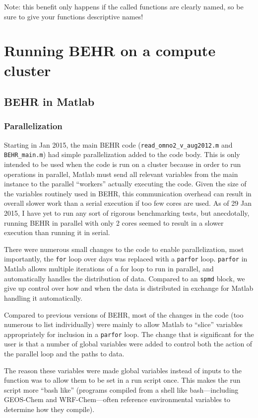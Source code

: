 \documentclass[12pt]{article}
\begin{document}
	Note: this benefit only happens if the called functions are clearly named, so be sure to give your functions descriptive names!



\section{Running BEHR on a compute cluster} \label{sec:Cluster}
	\subsection{BEHR in Matlab}
	\subsubsection{Parallelization}
		Starting in Jan 2015, the main BEHR code (\texttt{read\_omno2\_v\_aug2012.m} and \texttt{BEHR\_main.m}) had simple parallelization added to the code body.  This is only intended to be used when the code is run on a cluster because in order to run operations in parallel, Matlab must send all relevant variables from the main instance to the parallel ``workers'' actually executing the code.  Given the size of the variables routinely used in BEHR, this communication overhead can result in overall slower work than a serial execution if too few cores are used.  As of 29 Jan 2015, I have yet to run any sort of rigorous benchmarking tests, but anecdotally, running BEHR in parallel with only 2 cores seemed to result in a slower execution than running it in serial.
		
		There were numerous small changes to the code to enable parallelization, most importantly, the \texttt{for} loop over days was replaced with a \texttt{parfor} loop. \texttt{parfor} in Matlab allows multiple iterations of a for loop to run in parallel, and automatically handles the distribution of data.  Compared to an \texttt{spmd} block, we give up control over how and when the data is distributed in exchange for Matlab handling it automatically.
		
		Compared to previous versions of BEHR, most of the changes in the code (too numerous to list individually) were mainly to allow Matlab to ``slice'' variables appropriately for inclusion in a \texttt{parfor} loop.  The change that is significant for the user is that a number of global variables were added to control both the action of the parallel loop and the paths to data.  

		The reason these variables were made global variables instead of inputs to the function was to allow them to be set in a run script once. This makes the run script more ``bash like'' (programs compiled from a shell like bash---including GEOS-Chem and WRF-Chem---often reference environmental variables to determine how they compile).  
		
\end{document}
